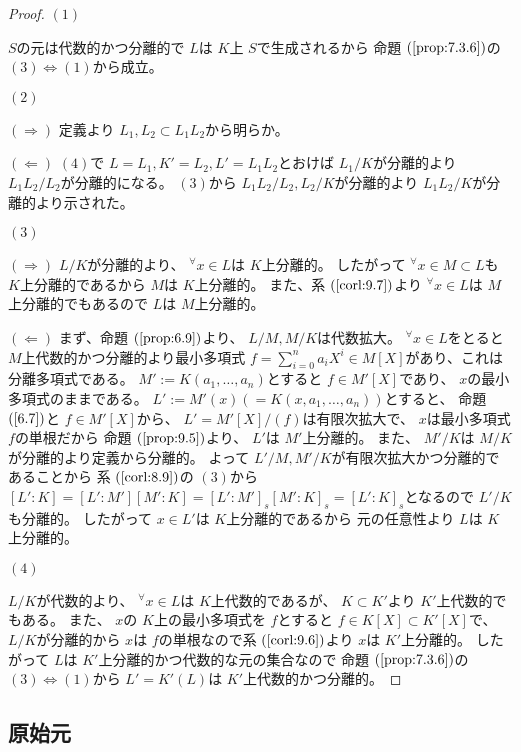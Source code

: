 \documentclass[../master_galois_theory]{subfiles}
\begin{document}
\begin{proof}
  $(1)$

  $S$の元は代数的かつ分離的で $L$は $K$上 $S$で生成されるから
  命題 $(\mathrm{\ref{prop:7.3.6}})$の $(3) \Leftrightarrow (1)$から成立。

  $(2)$

  $(\Rightarrow)$
   定義より $L_1 , L_2 \subset L_1 L_2$から明らか。

  $(\Leftarrow)$
  $(4)$で $L = L_1 , K' = L_2 , L' = L_1 L_2$とおけば
  $L_1/K$が分離的より $L_1 L_2 /L_2$が分離的になる。
  $(3)$から $L_1 L_2 /L_2 , L_2/K$が分離的より
  $L_1 L_2 / K$が分離的より示された。

  $(3)$

  $(\Rightarrow)$
  $L/K$が分離的より、 ${}^\forall x \in L$は $K$上分離的。
  したがって ${}^\forall x \in M \subset L$も $K$上分離的であるから
  $M$は $K$上分離的。
  また、系 $(\mathrm{\ref{corl:9.7}})$より
  ${}^\forall x \in L$は $M$上分離的でもあるので $L$は $M$上分離的。

  $(\Leftarrow)$
  まず、命題 $(\mathrm{\ref{prop:6.9}})$より、 $L/M , M/K$は代数拡大。
  ${}^\forall x \in L$をとると $M$上代数的かつ分離的より最小多項式 $f = \sum_{i=0}^n a_i X^i \in M[X]$があり、これは分離多項式である。
  $M' := K(a_1 , \dots , a_n)$とすると $f \in M'[X]$であり、 $x$の最小多項式のままである。
  $L' := M'(x) (= K(x , a_1 , \dots , a_n))$とすると、
  命題 $(\mathrm{\ref{6.7}})$と $f \in M'[X]$から、
  $L' = M'[X]/(f)$は有限次拡大で、 $x$は最小多項式 $f$の単根だから
  命題 $(\mathrm{\ref{prop:9.5}})$より、 $L'$は $M'$上分離的。
  また、 $M'/K$は $M/K$が分離的より定義から分離的。
  よって $L'/M , M'/K$が有限次拡大かつ分離的であることから
  系 $(\mathrm{\ref{corl:8.9}})$の $(3)$から
  $[L':K] = [L':M'][M':K] = [L':M']_s [M':K]_s = [L':K]_s$となるので
  $L'/K$も分離的。
  したがって $x \in L'$は $K$上分離的であるから
  元の任意性より $L$は $K$上分離的。

  $(4)$

  $L/K$が代数的より、 ${}^\forall x \in L$は $K$上代数的であるが、
  $K \subset K'$より $K'$上代数的でもある。
  また、 $x$の $K$上の最小多項式を $f$とすると
  $f \in K[X] \subset K'[X]$で、 $L/K$が分離的から
  $x$は $f$の単根なので系 $(\mathrm{\ref{corl:9.6}})$より
  $x$は $K'$上分離的。
  したがって $L$は $K'$上分離的かつ代数的な元の集合なので
  命題 $(\mathrm{\ref{prop:7.3.6}})$の $(3) \Leftrightarrow (1)$から
  $L' = K'(L)$は $K'$上代数的かつ分離的。
\end{proof}

\subsection{原始元}
\end{document}
